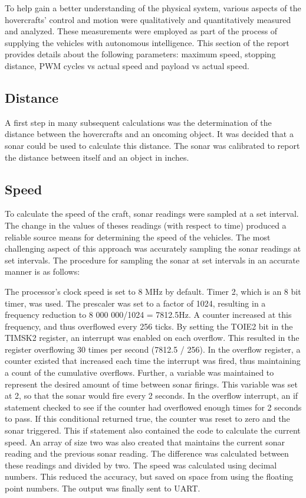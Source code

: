 ﻿To help gain a better understanding of the physical system, various aspects of the hovercrafts' control and motion were qualitatively and quantitatively measured and analyzed. These measurements were employed as part of the process of supplying the vehicles with autonomous intelligence. This section of the report provides details about the following parameters: maximum speed, stopping distance, PWM cycles vs actual speed and payload vs actual speed.

\subsection{Distance}
A first step in many subsequent calculations was the determination of the distance between the hovercrafts and an oncoming object. It was decided that a sonar could be used to calculate this distance. The sonar was calibrated to report the distance between itself and an object in inches.

\subsection{Speed}
To calculate the speed of the craft, sonar readings were sampled at a set interval.  The change in the values of theses readings (with respect to time) produced a reliable source means for determining the speed of the vehicles.  The most challenging aspect of this approach was accurately sampling the sonar readings at set intervals.  The procedure for sampling the sonar at set intervals in an accurate manner is as follows:

The processor's clock speed is set to 8 MHz by default.  Timer 2, which is an 8 bit timer, was used. The prescaler was set to a factor of 1024, resulting in a frequency reduction to 8 000 000/1024 = 7812.5Hz. A counter increased at this frequency, and thus  overflowed every 256 ticks. By setting the TOIE2 bit in the TIMSK2 register, an interrupt was enabled on each overflow. This resulted in the register overflowing 30 times per second (7812.5 / 256). In the overflow register, a counter existed that increased each time the interrupt was fired, thus maintaining a count of the cumulative overflows.  Further, a variable was maintained to represent the desired amount of time between sonar firings. This variable was set at 2, so that the sonar would fire every 2 seconds. In the overflow interrupt, an if statement checked to see if the counter had overflowed enough times for 2 seconds to pass. If this conditional returned true, the counter was reset to zero and the sonar triggered. This if statement also contained the code to calculate the current speed. An array of size two was also created that maintains the current sonar reading and the previous sonar reading. The difference was calculated between these readings and divided by two. The speed was calculated using decimal numbers. This reduced the accuracy, but saved on space from using the floating point numbers. The output was finally sent to UART.

